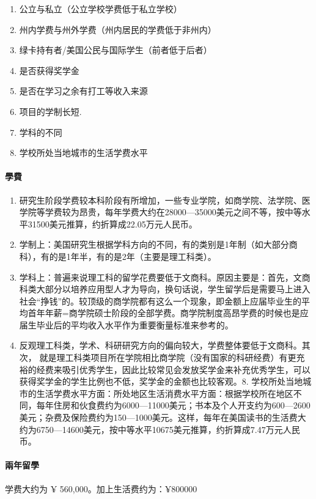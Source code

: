 \documentclass[11pt]{article}
\providecommand{\tightlist}{%
      \setlength{\itemsep}{0pt}\setlength{\parskip}{0pt}}
\begin{document}
\begin{enumerate}
\def\labelenumi{\arabic{enumi}.}
\tightlist
\item
  公立与私立（公立学校学费低于私立学校）
\item
  州内学费与州外学费（州内居民的学费低于非州内）
\item
  绿卡持有者/美国公民与国际学生（前者低于后者）
\item
  是否获得奖学金
\item
  是否在学习之余有打工等收入来源
\item
  项目的学制长短.
\item
  学科的不同
\item
  学校所处当地城市的生活学费水平 
\end{enumerate}

\hypertarget{ux5b78ux8cbb}{%
\paragraph{學費}\label{ux5b78ux8cbb}}

\begin{enumerate}
\def\labelenumi{\arabic{enumi}.}
\item
  研究生阶段学费较本科阶段有所增加，一些专业学院，如商学院、法学院、医学院等学费较为昂贵，每年学费大约在28000---35000美元之间不等，按中等水平31500美元推算，约折算成22.05万元人民币。
\item
  学制上：美国研究生根据学科方向的不同，有的类别是1年制（如大部分商科），有的是1年半，有的是2年（主要是理工科类）。
\item
  学科上：普遍来说理工科的留学花费要低于文商科。原因主要是：首先，文商科类大部分以培养应用型人才为导向，换句话说，学生留学后是需要马上进入社会``挣钱''的。较顶级的商学院都有这么一个现象，即金额上应届毕业生的平均首年年薪=商学院硕士阶段的全部学费。商学院制度高昂学费的时候也是应届生毕业后的平均收入水平作为重要衡量标准来参考的。
\item
  反观理工科类，学术、科研研究方向的偏向较大，学费整体要低于文商科。其次，
  就是理工科类项目所在学院相比商学院（没有国家的科研经费）有更充裕的经费来吸引优秀学生，因此比较常见会发放奖学金来补充优秀学生，可以获得奖学金的学生比例也不低，奖学金的金额也比较客观。8.
  学校所处当地城市的生活学费水平方面：所处地区生活消费水平方面：根据学校所在地区不同，每年住房和伙食费约为6000---11000美元；书本及个人开支约为600---2600美元；杂费及保险费约为150---1000美元。这样，每年在美国读书的生活费大约为6750---14600美元，按中等水平10675美元推算，约折算成7.47万元人民币。
\end{enumerate}

\hypertarget{ux5169ux5e74ux7559ux5b78}{%
\paragraph{兩年留學}\label{ux5169ux5e74ux7559ux5b78}}

学费大约为 ¥ 560,000。加上生活费约为：¥800000


    
    
    
    
\end{document}
